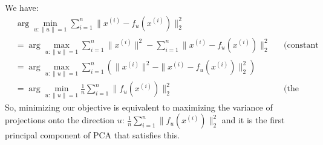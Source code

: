 \begin{answer}
We have:
\begin{align}
	&\arg\min_{u:\|u\|=1} \sum_{i=1}^n \|x^{(i)}-f_u(x^{(i)})\|_2^2 \\
	&= \arg\max_{u:\|u\|=1} \sum_{i=1}^n \|x^{(i)}\|^2 - \sum_{i=1}^n \|x^{(i)}-f_u(x^{(i)})\|_2^2 &&\text{(constant first summation)} \\
	&= \arg\max_{u:\|u\|=1} \sum_{i=1}^n \left(\|x^{(i)}\|^2 -  \|x^{(i)}-f_u(x^{(i)})\|_2^2\right) \\
	&= \arg\min_{u:\|u\|=1} \frac{1}{n} \sum_{i=1}^n \|f_u(x^{(i)})\|_2^2 &&\text{(the Pythagorean theorem)}
\end{align}
So, minimizing our objective is equivalent to maximizing the variance of projections onto the direction $u$: $\frac{1}{n} \sum_{i=1}^n \|f_u(x^{(i)})\|_2^2$ and it is the first principal component of PCA that satisfies this.
\end{answer}
